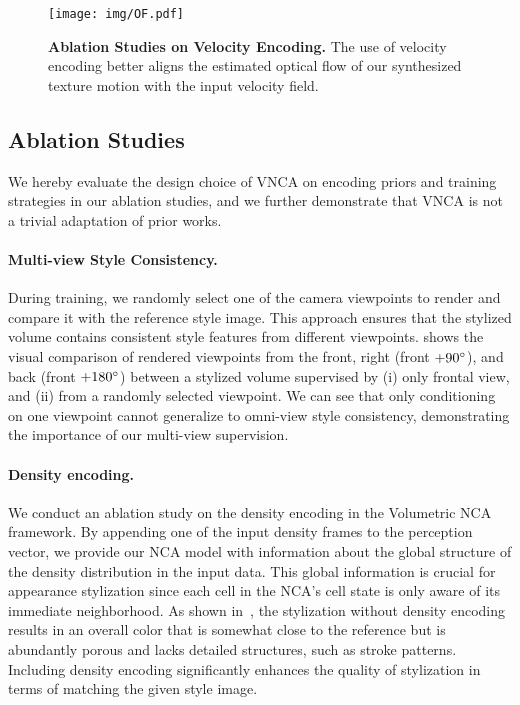 \begin{figure}
  \centering
  \texttt{[image: img/OF.pdf]}
  \caption{\textbf{Ablation Studies on Velocity Encoding.} The use of velocity encoding better aligns the estimated optical flow of our synthesized texture motion with the input velocity field. }
  \label{fig:OF}
\end{figure}




\subsection{Ablation Studies}
\label{sec:abl}
We hereby evaluate the design choice of VNCA on encoding priors and training strategies in our ablation studies, and we further demonstrate that VNCA is not a trivial adaptation of prior works. 

\paragraph{Multi-view Style Consistency. } 
During training, we randomly select one of the camera viewpoints to render and compare it with the reference style image. 
This approach ensures that the stylized volume contains consistent style features from different viewpoints. 
 shows the visual comparison of rendered viewpoints from the front, right (front $+90\degree$), and back (front $+180\degree$) between a stylized volume supervised by (i) only frontal view, and (ii) from a randomly selected viewpoint. 
We can see that only conditioning on one viewpoint cannot generalize to omni-view style consistency, demonstrating the importance of our multi-view supervision. 

\paragraph{Density encoding.} 
We conduct an ablation study on the density encoding in the Volumetric NCA framework. 
By appending one of the input density frames to the perception vector, we provide our NCA model with information about the global structure of the density distribution in the input data. 
This global information is crucial for appearance stylization since each cell in the NCA's cell state is only aware of its immediate neighborhood. 
As shown in~, the stylization without density encoding results in an overall color that is somewhat close to the reference but is abundantly porous and lacks detailed structures, such as stroke patterns.
Including density encoding significantly enhances the quality of stylization in terms of matching the given style image.

